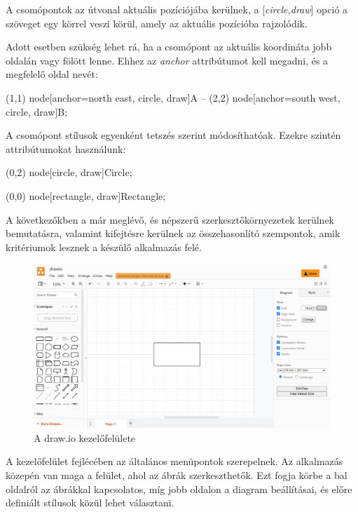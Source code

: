 A csomópontok az útvonal aktuális pozíciójába kerülnek, a [\textit{circle,draw}] opció a szöveget egy körrel veszi körül, amely az aktuális pozícióba rajzolódik.

Adott esetben szükség lehet rá, ha a csomópont az aktuális koordináta jobb oldalán vagy fölött lenne. Ehhez az \textit{anchor} attribútumot kell megadni, és a megfelelő oldal nevét:

\begin{tikzcode}
\draw 
(1,1) node[anchor=north east, circle, draw]{A} 
	-- 
(2,2) node[anchor=south west, circle, draw]{B}; 
\end{tikzcode}

A csomópont stílusok egyenként tetszés szerint módosíthatóak. Ezekre szintén attribútumokat használunk:

\begin{tikzcode}
\draw (0,2) node[circle, draw]{Circle};



\draw (0,0) node[rectangle, draw]{Rectangle}; 
\end{tikzcode}



A következőkben a már meglévő, és népszerű szerkesztőkörnyezetek kerülnek bemutatásra, valamint kifejtésre kerülnek az összehasonlító szempontok, amik kritériumok lesznek a készülő alkalmazás felé.


\begin{figure}[!h]
	\includegraphics[width=\textwidth]{images/drawio.png}
	\caption{A draw.io kezelőfelülete \cite{drawio}}
	\label{fig:drawio}
\end{figure}

A kezelőfelület fejlécében az általános menüpontok szerepelnek. Az alkalmazás közepén van maga a felület, ahol az ábrák szerkeszthetők. Ezt fogja körbe a bal oldalról az ábrákkal kapcsolatos, míg jobb oldalon a diagram beállításai, és előre definiált stílusok közül lehet választani. 


